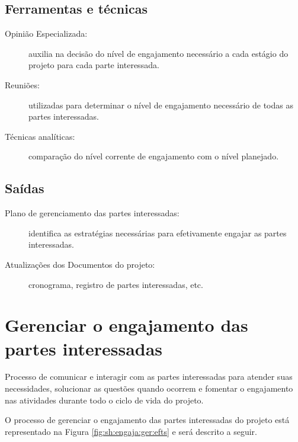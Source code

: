 \section{Ferramentas e técnicas}

\begin{description}
	
	\item[Opinião Especializada:] auxilia na decisão do nível de engajamento necessário a cada estágio do projeto para cada parte interessada.
	
	\item[Reuniões:] utilizadas para determinar o nível de engajamento necessário de todas as partes interessadas.
	
	\item[Técnicas analíticas:] comparação do nível corrente de engajamento com o nível planejado.
		
\end{description}

\section{Saídas}

\begin{description}

	\item[Plano de gerenciamento das partes interessadas:] identifica as estratégias necessárias para efetivamente engajar as partes interessadas.
	
	\item[Atualizações dos Documentos do projeto:] cronograma, registro de partes interessadas, etc.
	
\end{description}

\chapter{Gerenciar o engajamento das partes interessadas}
Processo de comunicar e interagir com as partes interessadas para atender suas necessidades, solucionar as questões quando ocorrem e fomentar o engajamento nas atividades durante todo o ciclo de vida do projeto.

O processo de gerenciar o engajamento das partes interessadas do projeto está representado na Figura \ref{fig:sh:engaja:ger:efts} e será descrito a seguir.

